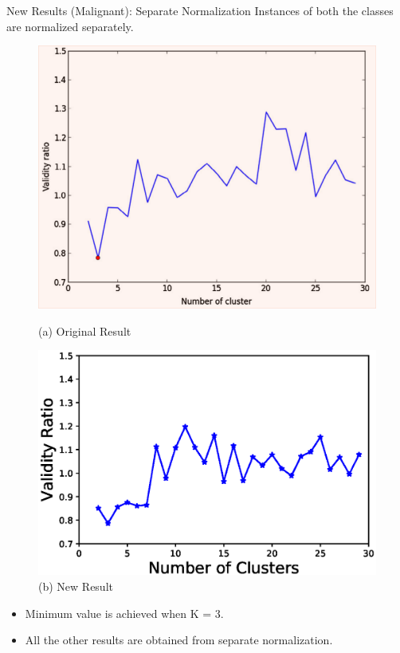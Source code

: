\documentclass[xcolor=dvipsnames]{beamer}
\begin{document}
\begin{frame}{New Results (Malignant): Separate Normalization}
Instances of both the classes are normalized separately.
\begin{figure}[H]
\begin{minipage}[t]{0.5\linewidth}
    \includegraphics[scale=0.2]{Figures/MalignantOriginal}
    \caption*{(a) Original Result}
\end{minipage}%
\begin{minipage}[t]{0.5\linewidth}
    \includegraphics[scale=0.43]{Figures/Malignant_VR_K_New.eps}
    \caption*{(b) New Result}
\end{minipage} 
\end{figure}

\begin{block}{}
\begin{itemize}
\item Minimum value is achieved when K = 3.
\item All the other results are obtained from separate normalization.
\end{itemize} 
\end{block}
\end{frame}
\end{document}
